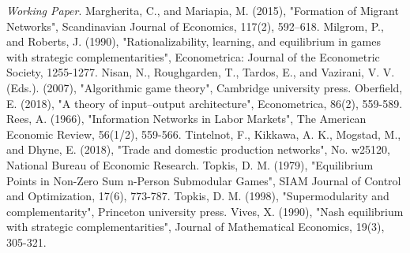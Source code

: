 \documentclass[12pt]{article}
\theoremstyle{definition}
\begin{document}
\begin{thebibliography}{99}
	\textit{Working Paper}.
	Margherita, C., and Mariapia, M. (2015),
	"Formation of Migrant  Networks",
	Scandinavian Journal of Economics, 117(2), 592–618.
	Milgrom, P., and Roberts, J. (1990),
	"Rationalizability, learning, and equilibrium in games with strategic complementarities",
	Econometrica: Journal of the Econometric Society, 1255-1277.
	Nisan, N., Roughgarden, T., Tardos, E., and Vazirani, V. V. (Eds.). (2007),
	"Algorithmic game theory",
	Cambridge university press.
	Oberfield, E. (2018),
	"A theory of input–output architecture",
	Econometrica, 86(2), 559-589.
	Rees, A. (1966),
	"Information Networks in Labor Markets",
	The American Economic Review, 56(1/2), 559-566.
	Tintelnot, F., Kikkawa, A. K., Mogstad, M., and Dhyne, E. (2018),
	"Trade and domestic production networks",
	No. w25120, National Bureau of Economic Research.
	Topkis, D. M. (1979),
	"Equilibrium Points in Non-Zero Sum n-Person Submodular Games",
	SIAM Journal of Control and Optimization, 17(6), 773-787.
	Topkis, D. M. (1998),
	"Supermodularity and complementarity",
	Princeton university press.
	Vives, X. (1990),
	"Nash equilibrium with strategic complementarities",
	Journal of Mathematical Economics, 19(3), 305-321.
\end{thebibliography}
\end{document}
